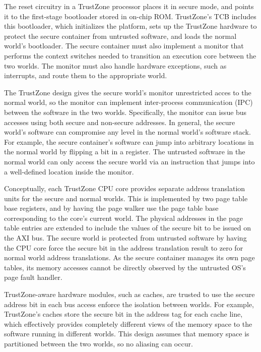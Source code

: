 The reset circuitry in a TrustZone processor places it in secure mode, and
points it to the first-stage bootloader stored in on-chip ROM. TrustZone's TCB
includes this bootloader, which initializes the platform, sets up the TrustZone
hardware to protect the secure container from untrusted software, and loads the
normal world's bootloader. The secure container must also implement a monitor
that performs the context switches needed to transition an execution core
between the two worlds. The monitor must also handle hardware exceptions, such
as interrupts, and route them to the appropriate world.

The TrustZone design gives the secure world's monitor unrestricted acces to the
normal world, so the monitor can implement inter-process communication (IPC)
between the software in the two worlds. Specifically, the monitor can issue
bus accesses using both secure and non-secure addresses. In general, the secure
world's software can compromise any level in the normal world's software stack.
For example, the secure container's software can jump into arbitrary locations
in the normal world by flipping a bit in a register. The untrusted software in
the normal world can only access the secure world via an instruction that jumps
into a well-defined location inside the monitor.

Conceptually, each TrustZone CPU core provides separate address translation
units for the secure and normal worlds. This is implemented by two page table
base registers, and by having the page walker use the page table base
corresponding to the core's current world. The physical addresses in the page
table entries are extended to include the values of the secure bit to be issued
on the AXI bus. The secure world is protected from untrusted software by having
the CPU core force the secure bit in the address translation result to zero for
normal world address translations. As the secure container manages its own page
tables, its memory accesses cannot be directly observed by the untrusted OS's
page fault handler.

TrustZone-aware hardware modules, such as caches, are trusted to use the secure
address bit in each bus access enforce the isolation between worlds. For
example, TrustZone's caches store the secure bit in the address tag for each
cache line, which effectively provides completely different views of the memory
space to the software running in different worlds. This design assumes that
memory space is partitioned between the two worlds, so no aliasing can occur.

